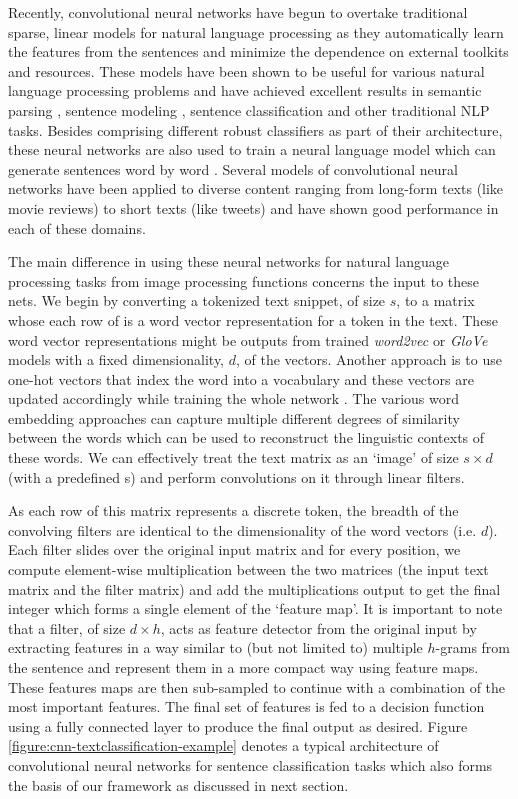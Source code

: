 Recently, convolutional neural networks have begun to overtake traditional sparse, linear models for natural language processing as they automatically learn the features from the sentences and minimize the dependence on external toolkits and resources. These models have been shown to be useful for various natural language processing problems and have achieved excellent results in semantic parsing \cite{grefenstette2014deep}, sentence modeling \cite{kalchbrenner2014convolutional}, sentence classification \cite{kim2014convolutional} and other traditional NLP tasks. Besides comprising different robust classifiers as part of their architecture, these neural networks are also used to train a neural language model which can generate sentences word by word \cite{son2012continuous}. Several models of convolutional neural networks have been applied to diverse content ranging from long-form texts (like movie reviews) to short texts (like tweets) and have shown good performance in each of these domains. 

The main difference in using these neural networks for natural language processing tasks from image processing functions concerns the input to these nets. We begin by converting a tokenized text snippet, of size $s$, to a matrix whose each row of is a word vector representation for a token in the text. These word vector representations might be outputs from trained {\it word2vec} \cite{mikolov2013distributed} or {\it GloVe} \cite{pennington2014glove} models with a fixed dimensionality, $d$, of the vectors. Another approach is to use one-hot vectors that index the word into a vocabulary and these vectors are updated accordingly while training the whole network \cite{johnson2014effective}. The various word embedding approaches can capture multiple different degrees of similarity between the words which can be used to reconstruct the linguistic contexts of these words. We can effectively treat the text matrix as an `image' of size $s \times d$ (with a predefined s) and perform convolutions on it through linear filters. 

As each row of this matrix represents a discrete token, the breadth of the convolving filters are identical to the dimensionality of the word vectors (i.e. $d$). Each filter slides over the original input matrix and for every position, we compute element-wise multiplication between the two matrices (the input text matrix and the filter matrix) and add the multiplications output to get the final integer which forms a single element of the `feature map'. It is important to note that a filter, of size $d \times h$, acts as feature detector from the original input by extracting features in a way similar to (but not limited to) multiple $h$-grams from the sentence and represent them in a more compact way using feature maps. These features maps are then sub-sampled to continue with a combination of the most important features. The final set of features is fed to a decision function using a fully connected layer to produce the final output as desired. Figure \ref{figure:cnn-textclassification-example} denotes a typical architecture of convolutional neural networks for sentence classification tasks \cite{collobert2011natural} which also forms the basis of our framework as discussed in next section. 

